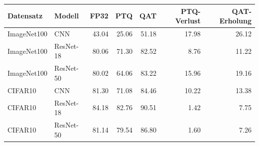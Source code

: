 \begin{tabular}{llrrrrr}
\toprule
Datensatz & Modell & FP32 & PTQ & QAT & PTQ-Verlust & QAT-Erholung \\
\midrule
ImageNet100 & CNN & 43.04 & 25.06 & 51.18 & 17.98 & 26.12 \\
ImageNet100 & ResNet-18 & 80.06 & 71.30 & 82.52 & 8.76 & 11.22 \\
ImageNet100 & ResNet-50 & 80.02 & 64.06 & 83.22 & 15.96 & 19.16 \\
CIFAR10 & CNN & 81.30 & 71.08 & 84.46 & 10.22 & 13.38 \\
CIFAR10 & ResNet-18 & 84.18 & 82.76 & 90.51 & 1.42 & 7.75 \\
CIFAR10 & ResNet-50 & 81.14 & 79.54 & 86.80 & 1.60 & 7.26 \\
\bottomrule
\end{tabular}
